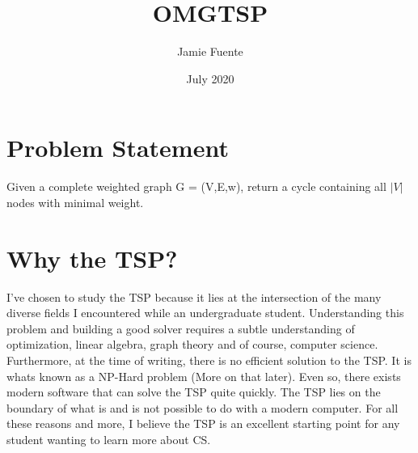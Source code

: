 \documentclass{article}
\title{OMGTSP}
\author{Jamie Fuente}
\date{July 2020}
\begin{document}
    \maketitle
    \section*{Problem Statement}
        Given a complete weighted graph G = (V,E,w), return a cycle containing all $|V|$ nodes
        with minimal weight.
    \section*{Why the TSP?}
        I've chosen to study the TSP because it lies at the intersection of the many diverse fields
        I encountered while an undergraduate student.
        Understanding this problem and building a good solver requires a subtle understanding of optimization, linear
        algebra, graph theory and of course, computer science.
        Furthermore, at the time of writing, there is no efficient solution to the TSP. It is whats known as a NP-Hard
        problem (More on that later).
        Even so, there exists modern software that can solve the TSP quite quickly.
        The TSP lies on the boundary of what is and is not possible to do with a modern computer.
        For all these reasons and more, I believe the TSP is an excellent starting point for any student wanting to
        learn more about CS.
\end{document}
